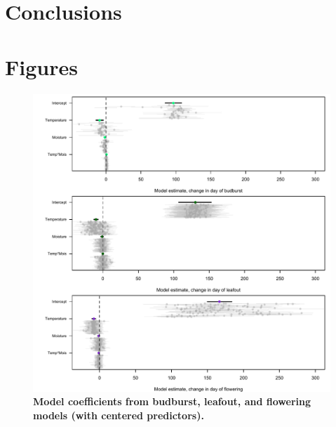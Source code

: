 \documentclass{article}
\begin{document}
\section* {Conclusions}



\clearpage
\section*{Figures}
\begin{figure}[h]
\centering
 \includegraphics{../../Analyses/soilmoisture/figures/m5bbdlodffd.pdf}
 \caption{\textbf{Model coefficients from budburst, leafout, and flowering models (with centered predictors).}} 
 \label{fig:bb}
 \end{figure}
\end{document}
